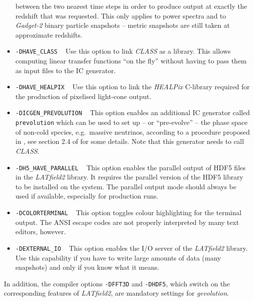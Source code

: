 \documentclass[a4paper,10pt]{article}
\begin{document}
\begin{itemize}
 between the two nearest time steps in order to produce output at exactly the redshift that was requested. This only applies to power spectra and to \textit{Gadget-2} binary particle snapshots -- metric snapshots are still taken at approximate redshifts.
 \item[] \hspace{-25pt}\texttt{-DHAVE\_CLASS} ~ Use this option to link \textit{CLASS} as a library. This allows computing linear transfer functions ``on the fly'' without having to pass them as input files to the IC generator.
 \item[] \hspace{-25pt}\texttt{-DHAVE\_HEALPIX} ~ Use this option to link the \textit{HEALPix} C-library required for the production of
 pixelised light-cone output.
 \item[] \hspace{-25pt}\texttt{-DICGEN\_PREVOLUTION} ~ This option enables an additional IC generator called \texttt{prevolution} which can 
 be used to set up -- or ``pre-evolve'' -- the phase space of non-cold species, e.g.\ massive neutrinos, according to a procedure proposed in \cite{Ma:1993xs}, see
section 2.4 of \cite{Adamek:2017uiq} for some details. Note that this generator needs to call \textit{CLASS}.
 \item[] \hspace{-25pt}\texttt{-DH5\_HAVE\_PARALLEL} ~ This option enables the parallel output of HDF5 files in the \textit{LATfield2} 
 library. It requires the parallel version of the HDF5 library to be installed on the system. The parallel output mode should always be used if available, especially for production runs.
 \item[] \hspace{-25pt}\texttt{-DCOLORTERMINAL} ~ This option toggles colour highlighting for the terminal output. The ANSI escape codes are not properly interpreted by many text editors, however.
 \item[] \hspace{-25pt}\texttt{-DEXTERNAL\_IO} ~ This option enables the I/O server of the \textit{LATfield2} library. Use this capability if you have to write large amounts of data (many snapshots) and only if you know what it means.
\end{itemize}

\noindent In addition, the compiler options \texttt{-DFFT3D} and \texttt{-DHDF5}, which switch on the corresponding features of \textit{LATfield2}, are mandatory settings for \textit{gevolution}.
\end{document}

